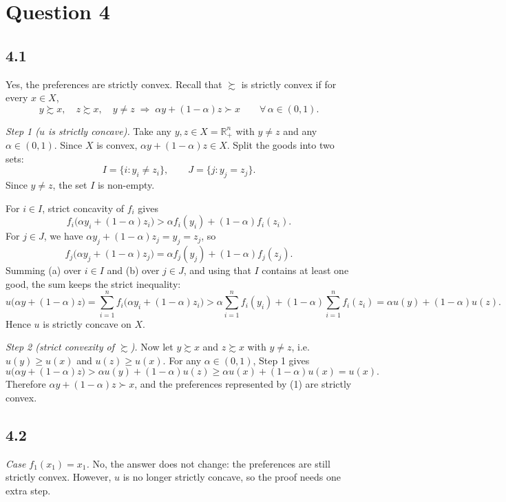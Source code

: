 \documentclass[12pt,letterpaper]{article}
\begin{document}
\section*{Question 4}

\subsection*{4.1}

Yes, the preferences are strictly convex. Recall that $\succsim$ is strictly convex if for every $x\in X$,
\[
y\succsim x,\quad z\succsim x,\quad y\neq z \;\Longrightarrow\; \alpha y+(1-\alpha)z \succ x \qquad \forall\,\alpha\in(0,1).
\]

\textit{Step 1 ($u$ is strictly concave).} Take any $y,z\in X=\mathbb{R}^n_+$ with $y\neq z$ and any $\alpha\in(0,1)$. Since $X$ is convex, $\alpha y+(1-\alpha)z\in X$. Split the goods into two sets:
\[
I=\{i : y_i\neq z_i\}, \qquad J=\{j : y_j = z_j\}.
\]
Since $y\neq z$, the set $I$ is non-empty.

For $i\in I$, strict concavity of $f_i$ gives
\[
f_i\big(\alpha y_i+(1-\alpha)z_i\big) > \alpha f_i(y_i)+(1-\alpha)f_i(z_i). \tag{a}
\]
For $j\in J$, we have $\alpha y_j+(1-\alpha)z_j = y_j = z_j$, so
\[
f_j\big(\alpha y_j+(1-\alpha)z_j\big) = \alpha f_j(y_j)+(1-\alpha)f_j(z_j). \tag{b}
\]
Summing (a) over $i\in I$ and (b) over $j\in J$, and using that $I$ contains at least one good, the sum keeps the strict inequality:
\[
u\big(\alpha y+(1-\alpha)z\big) = \sum_{i=1}^n f_i\big(\alpha y_i+(1-\alpha)z_i\big) > \alpha\sum_{i=1}^n f_i(y_i)+(1-\alpha)\sum_{i=1}^n f_i(z_i) = \alpha u(y)+(1-\alpha)u(z).
\]
Hence $u$ is strictly concave on $X$.

\textit{Step 2 (strict convexity of $\succsim$).} Now let $y\succsim x$ and $z\succsim x$ with $y\neq z$, i.e.\ $u(y)\ge u(x)$ and $u(z)\ge u(x)$. For any $\alpha\in(0,1)$, Step 1 gives
\[
u\big(\alpha y+(1-\alpha)z\big) > \alpha u(y)+(1-\alpha)u(z) \ge \alpha u(x)+(1-\alpha)u(x) = u(x).
\]
Therefore $\alpha y+(1-\alpha)z \succ x$, and the preferences represented by (1) are strictly convex.



\subsection*{4.2}

\textit{Case $f_1(x_1)=x_1$.} No, the answer does not change: the preferences are still strictly convex. However, $u$ is no longer strictly concave, so the proof needs one extra step.
\end{document}
